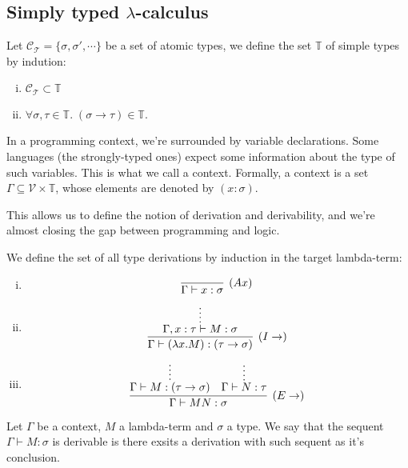 \subsection{Simply typed $\lambda$-calculus}

\begin{mydef}[Type]
Let $\mathcal{C}_{\mathcal{T}} = \{ \sigma, \sigma', \cdots \}$ be a set of atomic types,
we define the set $\mathbb{T}$ of simple types by indution:
\begin{enumerate}[i)]
  \item $\mathcal{C}_{\mathcal{T}} \subset \mathbb{T}$
  \item $\forall \sigma, \tau \in \mathbb{T}. \; (\sigma \rightarrow \tau) \in \mathbb{T}$.
\end{enumerate}
\end{mydef}

In a programming context, we're surrounded by variable declarations. Some languages (the strongly-typed ones)
expect some information about the type of such variables. This is what we call a context.
Formally, a context is a set $\Gamma \subseteq \mathcal{V} \times \mathbb{T}$, whose elements
are denoted by $(x : \sigma)$.

This allows us to define the notion of derivation and derivability, and we're almost closing the
gap between programming and logic.\\

\begin{mydef}[Derivation]
\label{def:simpletypederivation}
We define the set of all type derivations by induction in the target lambda-term:
\begin{enumerate}[i)]
  \item
    \[\vcenter{\infer[(Ax)]{\Gamma \vdash x:\sigma}{}} \]
    
  \item 
    \[\vcenter{\infer[(I\rightarrow)]{\Gamma \vdash (\lambda x.M) : (\tau \rightarrow \sigma)}
							{\infer*{\Gamma, x:\tau \vdash M:\sigma}{}}} \]

  \item 
    \[\vcenter{
			\infer[(E\rightarrow)]
				{\Gamma \vdash MN : \sigma}
				{
					\infer*
						{\Gamma \vdash M:(\tau \rightarrow \sigma)}
						{}
				&
					\infer*
						{\Gamma \vdash N:\tau}
						{}
				}
		
		}\]
\end{enumerate}
\end{mydef}

\begin{mydef}[Derivability]
Let $\Gamma$ be a context, $M$ a lambda-term and $\sigma$ a type. We say that
the sequent $\Gamma \vdash M : \sigma$ is derivable is there exsits a derivation with
such sequent as it's conclusion.
\end{mydef}


